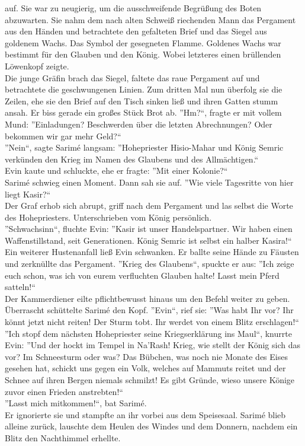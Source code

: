 auf. Sie war zu neugierig, um die ausschweifende Begrüßung des Boten abzuwarten. Sie nahm dem nach 
alten Schweiß riechenden Mann das Pergament aus den Händen und betrachtete den 
gefalteten Brief und das Siegel aus goldenem Wachs. Das Symbol der gesegneten Flamme. Goldenes Wachs 
war bestimmt für den Glauben und den König. Wobei letzteres einen brüllenden Löwenkopf zeigte.\\
Die junge Gräfin brach das Siegel, faltete das raue Pergament auf und betrachtete die geschwungenen 
Linien. Zum dritten Mal nun überfolg sie die Zeilen, ehe sie den Brief auf den Tisch sinken ließ 
und ihren Gatten stumm ansah. Er biss gerade ein großes Stück Brot ab. ''Hm?``, fragte er mit 
vollem Mund: ''Einladungen? Beschwerden über die letzten Abrechnungen? Oder bekommen wir gar 
mehr Geld?``\\
''Nein``, sagte Sarimé langsam: ''Hohepriester Hisio-Mahar und König Semric verkünden den Krieg im 
Namen des Glaubens und des Allmächtigen.``\\
Evin kaute und schluckte, ehe er fragte: ''Mit einer Kolonie?``\\
Sarimé schwieg einen Moment. Dann sah sie auf. ''Wie viele Tagesritte von hier liegt Kasir?``\\
Der Graf erhob sich abrupt, griff nach dem Pergament und las selbst die Worte des Hohepriesters. 
Unterschrieben vom König persönlich.\\
''Schwachsinn``, fluchte Evin: ''Kasir ist unser Handelspartner. Wir haben einen Waffenstillstand, 
seit Generationen. König Semric ist selbst ein halber Kasira!``\\
Ein weiterer Hustenanfall ließ Evin schwanken. Er ballte seine Hände zu Fäusten und zerknüllte das 
Pergament. ''Krieg des Glaubens``, spuckte er aus: ''Ich zeige euch schon, was ich von eurem 
verfluchten Glauben halte! Lasst mein Pferd satteln!``\\
Der Kammerdiener eilte pflichtbewusst hinaus um den Befehl weiter zu geben. Überrascht schüttelte 
Sarimé den Kopf. ''Evin``, rief sie: ''Was habt Ihr vor? Ihr könnt jetzt nicht reiten! Der 
Sturm tobt. Ihr werdet von einem Blitz erschlagen!``\\
''Ich stopf dem nächsten Hohepriester seine Kriegserklärung ins Maul``, knurrte Evin: ''Und 
der hockt im Tempel in Na'Rash! Krieg, wie stellt der König sich das vor? Im Schneesturm oder was? 
Das Bübchen, was noch nie Monate des Eises gesehen hat, schickt uns gegen ein Volk, welches auf 
Mammuts reitet und der Schnee auf ihren Bergen niemals schmilzt! Es gibt Gründe, wieso 
unsere Könige zuvor einen Frieden anstrebten!``\\
''Lasst mich mitkommen!``, bat Sarimé.\\
Er ignorierte sie und stampfte an ihr vorbei aus dem Speisesaal. Sarimé blieb alleine zurück, 
lauschte dem Heulen des Windes und dem Donnern, nachdem ein Blitz den Nachthimmel erhellte.\\


